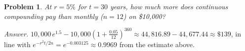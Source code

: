 \documentclass[11pt]{article}
\theoremstyle{seneca}
\newtheorem{problem}{Problem}
\begin{document}
\begin{problem}
At $r = 5\%$ for $t = 30$ years, how much more does continuous compounding pay than monthly ($n = 12$) on \$10{,}000?
\end{problem}
\emph{Answer.} $10{,}000\,e^{1.5} - 10{,}000\left(1 + \tfrac{0.05}{12}\right)^{360} \approx 44{,}816.89 - 44{,}677.44 \approx \$139$,
in line with $e^{-r^2t/2n} = e^{-0.003125} \approx 0.9969$ from the estimate above.
\end{document}
